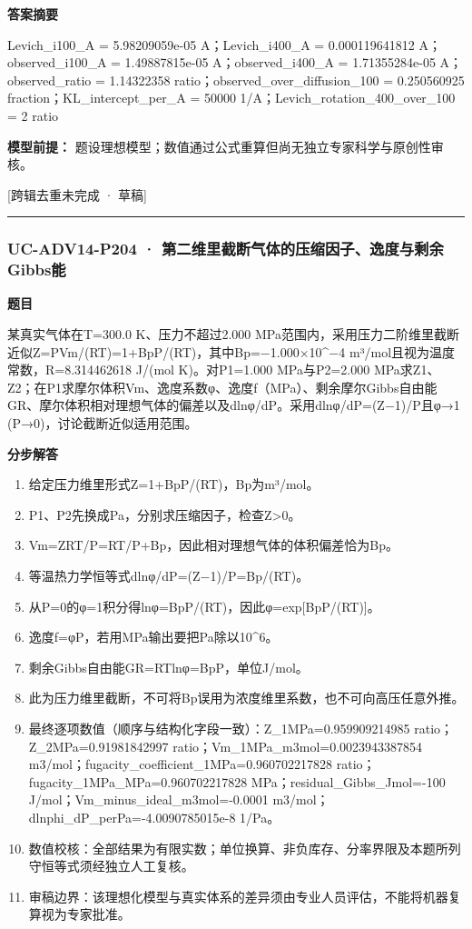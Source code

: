 \documentclass[UTF8,11pt,a4paper]{ctexart}
\begin{document}
\noindent\textbf{答案摘要}\par
Levich\_i100\_A = 5.98209059e-05 A；Levich\_i400\_A = 0.000119641812 A；observed\_i100\_A = 1.49887815e-05 A；observed\_i400\_A = 1.71355284e-05 A；observed\_ratio = 1.14322358 ratio；observed\_over\_diffusion\_100 = 0.250560925 fraction；KL\_intercept\_per\_A = 50000 1/A；Levich\_rotation\_400\_over\_100 = 2 ratio\par
\noindent\textbf{模型前提：}
题设理想模型；数值通过公式重算但尚无独立专家科学与原创性审核。\par
\noindent\textcolor{red!65!black}{[跨辑去重未完成 · 草稿]} \par
\medskip\hrule\medskip
{}
\subsubsection*{UC-ADV14-P204 · 第二维里截断气体的压缩因子、逸度与剩余Gibbs能}
\noindent\textbf{题目}\par
某真实气体在T=300.0 K、压力不超过2.000 MPa范围内，采用压力二阶维里截断近似Z=PVm/(RT)=1+BpP/(RT)，其中Bp=−1.000×10\textasciicircum{}−4 m³/mol且视为温度常数，R=8.314462618 J/(mol K)。对P1=1.000 MPa与P2=2.000 MPa求Z1、Z2；在P1求摩尔体积Vm、逸度系数φ、逸度f（MPa）、剩余摩尔Gibbs自由能GR、摩尔体积相对理想气体的偏差以及dlnφ/dP。采用dlnφ/dP=(Z−1)/P且φ→1 (P→0)，讨论截断近似适用范围。\par
\medskip\noindent\textbf{分步解答}
\begin{enumerate}
\item 给定压力维里形式Z=1+BpP/(RT)，Bp为m³/mol。
\item P1、P2先换成Pa，分别求压缩因子，检查Z>0。
\item Vm=ZRT/P=RT/P+Bp，因此相对理想气体的体积偏差恰为Bp。
\item 等温热力学恒等式dlnφ/dP=(Z−1)/P=Bp/(RT)。
\item 从P=0的φ=1积分得lnφ=BpP/(RT)，因此φ=exp[BpP/(RT)]。
\item 逸度f=φP，若用MPa输出要把Pa除以10\textasciicircum{}6。
\item 剩余Gibbs自由能GR=RTlnφ=BpP，单位J/mol。
\item 此为压力维里截断，不可将Bp误用为浓度维里系数，也不可向高压任意外推。
\item 最终逐项数值（顺序与结构化字段一致）：Z\_1MPa=0.959909214985 ratio；Z\_2MPa=0.91981842997 ratio；Vm\_1MPa\_m3mol=0.0023943387854 m3/mol；fugacity\_coefficient\_1MPa=0.960702217828 ratio；fugacity\_1MPa\_MPa=0.960702217828 MPa；residual\_Gibbs\_Jmol=-100 J/mol；Vm\_minus\_ideal\_m3mol=-0.0001 m3/mol；dlnphi\_dP\_perPa=-4.0090785015e-8 1/Pa。
\item 数值校核：全部结果为有限实数；单位换算、非负库存、分率界限及本题所列守恒等式须经独立人工复核。
\item 审稿边界：该理想化模型与真实体系的差异须由专业人员评估，不能将机器复算视为专家批准。
\end{enumerate}
\end{document}
